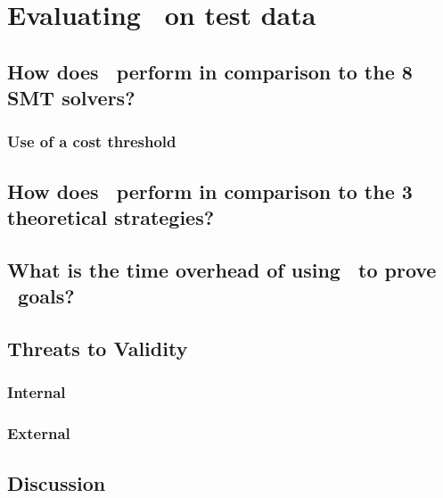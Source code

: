 \chapter{Evaluating \where~on test data}%

\label{Evaluation} %


\section{How does \where~perform in comparison to the 8 SMT solvers?}
\subsection{Use of a cost threshold}

\section{How does \where~perform in comparison to the 3 theoretical strategies?}

\section{What is the time overhead of using \where~to prove \why~goals?}

\section{Threats to Validity}
\label{sec:threats}
\subsection{Internal}
\subsection{External}


\section{Discussion}